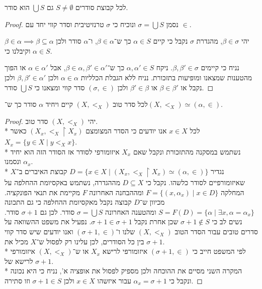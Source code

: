\begin{proposition}
	לכל קבוצת סודרים $S \ne \emptyset$ גם $\bigcup S$ הוא סודר.
\end{proposition}
\begin{proof}
	נסמן $\sigma = \bigcup S$ ונוכיח כי $\sigma$ טרנזיטיבית וסדר קווי יחד עם $\in$.

	יהי $\beta \in \sigma$, מהגדרת $\sigma$ נקבל כי קיים $\alpha \in S$ כך ש־$\beta \in \alpha$, ו־$\alpha$ סודר ולכן $\beta \in \alpha \implies \beta \subseteq \alpha$ וקיבלנו כי $\alpha \in S$.

	נניח כי קיימים $\beta, \beta' \in \sigma$. ניקח $\alpha, \alpha' \in S$ כך ש־$\beta \in \alpha, \beta' \in \alpha'$, אבל $\alpha \in \alpha'$ או הפוך מהטענות שמצאנו ומופיעות בתזכורת.
	נניח ללא הגבלת הכלליות $\alpha \in \alpha$ ולכן $\beta, \beta' \in \alpha'$ ולכן נקבל או $\beta \in \beta'$ או $\beta' \in \beta$ ולכן $(\sigma, \in)$ סדר קווי ומצאנו כי $\bigcup S$ סודר.
\end{proof}
\begin{theorem}
	לכל סדר טוב $(X, <_X)$ קיים ויחיד $\alpha$ סודר כך ש־$(X, <_X) \simeq (\alpha, \in)$.
\end{theorem}
\begin{proof}
	יהי $(X, <_X)$ סדר טוב. \\*
	לכל $x \in X$ אנו יודעים כי הסדר המצומצם $(X_x, <_X \upharpoonright X_x)$ כאשר $X_x = \{ y \in X \mid y <_X x \}$. \\*
	נשתמש במסקנה מהתזכורת ונקבל שאם $X_x$ איזומורפי לסודר אז הסודר הזה הוא יחיד ונסמנו $\alpha_x$. \\*
	נגדיר $D = \{ x \in X \mid (X_x, <_X \upharpoonright X_x) \simeq (\alpha, \in) \}$ קבוצת האיברים ב־$X$ שאיזומורפיים לסודר כלשהו.
	נקבל כי $D \subseteq X$ מההגדרה, נשתמש באקסיומת ההחלפה על המחלקה $F = \{ (x, \alpha_x) \mid x \in D \}$ ומההבחנה האחרונה $F$ מקיימת את תנאי הפונקציה.
	מכיוון ש־$D$ קבוצה נקבל מאקסיומת ההחלפה כי גם התכונה $S = F(D) = \{ \alpha \mid \exists x, \alpha = \alpha_x \}$ ומהטענה האחרונה $\sigma = \bigcup S$ סודר.
	לכן גם $\sigma + 1$ סודר.
	נשים לב כי $\sigma + 1 \notin S$ שכן אחרת נקבל $\sigma + 1 \in \sigma + 1$.
	נפעיל את משפט ההשוואה על סדרים טובים עבור הסדר הטוב $(X, <_X)$ שלנו ו־$(\sigma + 1, \in)$ ואנו יודעים שיש סדר קווי בין כל הסודרים, לכן עלינו רק לפסול ש־$X$ מכיל את $\sigma + 1$. \\*
	לפי המשפט חייב כי $(\sigma + 1, \in)$ איזומורפי לרישא $X_x$ או ש־$(X, <_X)$ איזומורפי לרישא של $\sigma + 1$. \\*
	המקרה השני מסיים את ההוכחה ולכן מספיק לפסול את אופציה א', נניח כי היא נכונה ונקבל כי $\alpha_x = \sigma + 1$ עבור איזשהו $x \in X$ ולכן $\sigma + 1 \in S$ וזו סתירה.
\end{proof}
